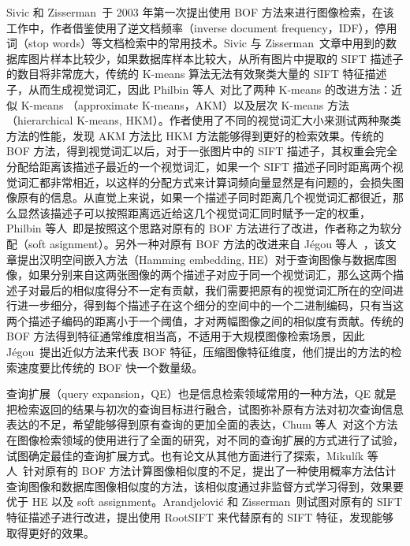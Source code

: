 Sivic 和 Zisserman~\cite{Sivic2003VideoGA}于 2003 年第一次提出使用 BOF 方法来进行图像检索，在该工作中，作者借鉴使用了逆文档频率（inverse document frequency，IDF），停用词（stop words）等文档检索中的常用技术。Sivic 与 Zisserman~\cite{Sivic2003VideoGA}文章中用到的数据库图片样本比较少，如果数据库样本比较大，从所有图片中提取的 SIFT 描述子的数目将非常庞大，传统的 K-means 算法无法有效聚类大量的 SIFT 特征描述子，从而生成视觉词汇，因此 Philbin 等人~\cite{Philbin2007ObjectRW}对比了两种 K-means 的改进方法：近似 K-means （approximate K-means，AKM）以及层次 K-means 方法（hierarchical K-means, HKM）。作者使用了不同的视觉词汇大小来测试两种聚类方法的性能，发现 AKM 方法比 HKM 方法能够得到更好的检索效果。传统的 BOF 方法，得到视觉词汇以后，对于一张图片中的 SIFT 描述子，其权重会完全分配给距离该描述子最近的一个视觉词汇，如果一个 SIFT 描述子同时距离两个视觉词汇都非常相近，以这样的分配方式来计算词频向量显然是有问题的，会损失图像原有的信息。从直觉上来说，如果一个描述子同时距离几个视觉词汇都很近，那么显然该描述子可以按照距离远近给这几个视觉词汇同时赋予一定的权重，Philbin 等人~\cite{Philbin2008LostIQ}即是按照这个思路对原有的 BOF 方法进行了改进，作者称之为软分配（soft asignment）。另外一种对原有 BOF 方法的改进来自 J{\'e}gou 等人~\cite{Jgou2008HammingEA}，该文章提出汉明空间嵌入方法（Hamming embedding, HE）对于查询图像与数据库图像，如果分别来自这两张图像的两个描述子对应于同一个视觉词汇，那么这两个描述子对最后的相似度得分不一定有贡献，我们需要把原有的视觉词汇所在的空间进行进一步细分，得到每个描述子在这个细分的空间中的一个二进制编码，只有当这两个描述子编码的距离小于一个阈值，才对两幅图像之间的相似度有贡献。传统的 BOF 方法得到特征通常维度相当高，不适用于大规模图像检索场景，因此 J{\'e}gou~\cite{Jgou2009PackingB}提出近似方法来代表 BOF 特征，压缩图像特征维度，他们提出的方法的检索速度要比传统的 BOF 快一个数量级。

查询扩展（query expansion，QE）也是信息检索领域常用的一种方法，QE 就是把检索返回的结果与初次的查询目标进行融合，试图弥补原有方法对初次查询信息表达的不足，希望能够得到原有查询的更加全面的表达，Chum 等人~\cite{Chum2007TotalRA}对这个方法在图像检索领域的使用进行了全面的研究，对不同的查询扩展的方式进行了试验，试图确定最佳的查询扩展方式。也有论文从其他方面进行了探索，Mikulík 等人~\cite{Mikulk2010LearningAF}针对原有的 BOF 方法计算图像相似度的不足，提出了一种使用概率方法估计查询图像和数据库图像相似度的方法，该相似度通过非监督方式学习得到，效果要优于 HE 以及 soft assignment。Arandjelovi{\'c} 和 Zisserman~\cite{Arandjelovic2012ThreeTE}则试图对原有的 SIFT 特征描述子进行改进，提出使用 RootSIFT 来代替原有的 SIFT 特征，发现能够取得更好的效果。

